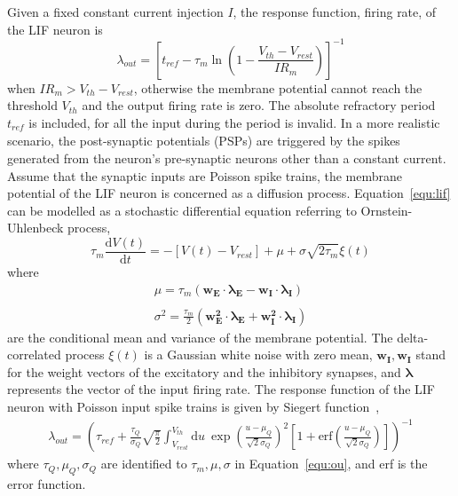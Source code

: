 \documentclass[journal]{journal}
\def\D{\mathrm{d}}
\begin{document}
Given a fixed constant current injection $I$, the response function, firing rate, of the LIF neuron is
\begin{equation}
\lambda_\mathit{out}=
\left [ t_\mathit{ref}-\tau_m\ln \left ( 1-\frac{V_{th}-V_\mathit{rest}}{IR_m}  \right )\right ]^{-1}
\label{equ:consI}
\end{equation}
when $IR_m>V_{th}-V_{rest}$, otherwise the membrane potential cannot reach the threshold $V_{th}$ and the output firing rate is zero. 
The absolute refractory period $t_\mathit{ref}$ is included, for all the input during the period is invalid.
In a more realistic scenario, the post-synaptic potentials (PSPs) are triggered by the spikes generated from the neuron's pre-synaptic neurons other than a constant current.
Assume that the synaptic inputs are Poisson spike trains, the membrane potential of the LIF neuron is concerned as a diffusion process. Equation~\ref{equ:lif} can be modelled as a stochastic differential equation referring to Ornstein-Uhlenbeck process,
\begin{equation}
\tau_m\frac{\D V(t)}{\D t}=-\left[V(t)-V_\mathit{rest}\right] + \mu + \sigma\sqrt{2\tau_m}\xi (t)
\label{equ:sde}
\end{equation}
where
\begin{equation}
\begin{array}{l}
\mu=\tau_m(\mathbf{w_E\cdot\lambda_E}-\mathbf{w_I\cdot\lambda_I})
\\
\\
\sigma ^{2} = \frac{\tau_m}{2}\left(\mathbf{w_E^{2}\cdot\lambda_E}+\mathbf{w_I^{2}\cdot\lambda_I}\right)
\end{array}
\label{equ:ou}
\end{equation}
are the conditional mean and variance of the membrane potential.
The delta-correlated process $\xi(t)$ is a Gaussian white noise with zero mean, $\mathbf{w_I},\mathbf{w_I}$ stand for the weight vectors of the excitatory and the inhibitory synapses, and $\mathbf{\lambda}$ represents the vector of the input firing rate.
The response function of the LIF neuron with Poisson input spike trains is given by Siegert function~\cite{siegert1951first}, 
\begin{equation}
\begin{split}
\lambda_\mathit{out}=\left(\tau_\mathit{ref} + \frac{\tau_Q}{\sigma_Q}\sqrt{\frac{\pi}{2}} \int_{V_\mathit{rest}}^{V_\mathit{th}}\D u \:\exp \left(\frac{u-\mu_Q}{\sqrt2\sigma_Q} \right )^{2}\left[1+\mathrm{erf} \left(\frac{u-\mu_Q}{\sqrt2\sigma_Q} \right ) \right ]\right)^{-1}
\end{split}
\label{equ:sgt}
\end{equation}
where $\tau_Q, \mu_Q, \sigma_Q$ are identified to $\tau_m, \mu, \sigma$ in Equation~\ref{equ:ou}, and erf is the error function.
\end{document}
